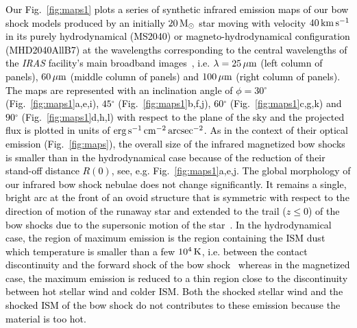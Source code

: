 \documentclass[useAMS,usenatbib]{mn2e}
\newcommand{\degree}{\ensuremath{^\circ}}
\begin{document}
\textcolor{black}{
Our Fig.~\ref{fig:maps1} plots a series of synthetic infrared emission maps of our bow 
shock models produced by an initially $20\, \rm M_{\odot}$ star moving with 
velocity $40\, \rm km\, \rm s^{-1}$ in its purely hydrodynamical (MS2040) or 
magneto-hydrodynamical configuration (MHD2040AllB7) at the wavelengths 
corresponding to the central wavelengths of the {\it IRAS} facility's main 
broadband images~\citep{vanburen_apj_329_1988}, i.e. $\lambda=25\, \rm \mu m$ (left column 
of panels), $60\, \rm \mu m$ (middle column of panels) and $100\, \rm \mu m$ 
(right column of panels). The maps are represented with an inclination angle of 
$\phi=30\degree$ (Fig.~\ref{fig:maps1}a,e,i), $45\degree$ 
(Fig.~\ref{fig:maps1}b,f,j), $60\degree$ (Fig.~\ref{fig:maps1}c,g,k) and 
$90\degree$ (Fig.~\ref{fig:maps1}d,h,l) with respect to the plane of the 
sky and the projected flux is plotted in units of $\rm erg\, \rm s^{-1}\, \rm 
cm^{-2}\, \rm arcsec^{-2}$. As in the context of their optical emission 
(Fig.~\ref{fig:maps}), the overall size of the infrared magnetized bow shocks is 
smaller than in the hydrodynamical case because of the reduction of their 
stand-off distance $R(0)$, see, e.g. Fig.~\ref{fig:maps1}a,e,j. 
The global morphology of our infrared bow shock 
nebulae does not change significantly. It remains a single, bright arc at the 
front of an ovoid structure that is symmetric with respect to the direction of 
motion of the runaway star and extended to the trail ($z \le 0$) of the bow shocks 
due to the supersonic motion of the star~\citet{acreman_mnras_456_2016}. In the 
hydrodynamical case, the region of maximum emission is the region containing the 
ISM dust which temperature is smaller than a few $10^{4}\, \rm K$, i.e. 
between the contact discontinuity and the forward shock of the bow 
shock~\citep[Paper~I,][]{acreman_mnras_456_2016} whereas in the magnetized case, 
the maximum emission is reduced to a thin region close to the discontinuity 
between hot stellar wind and colder ISM. Both the shocked stellar wind and the 
shocked ISM of the bow shock do not contributes to these emission 
because the material is too hot. 
}
\end{document}
